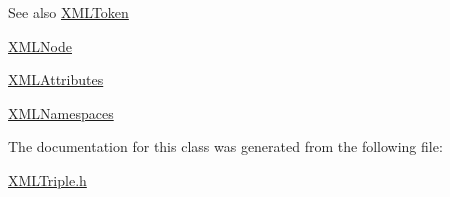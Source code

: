 \begin{DoxySeeAlso}{See also}
\hyperlink{class_x_m_l_token}{X\+M\+L\+Token} 

\hyperlink{class_x_m_l_node}{X\+M\+L\+Node} 

\hyperlink{class_x_m_l_attributes}{X\+M\+L\+Attributes} 

\hyperlink{class_x_m_l_namespaces}{X\+M\+L\+Namespaces} 
\end{DoxySeeAlso}


The documentation for this class was generated from the following file\+:\begin{DoxyCompactItemize}
\item 
\hyperlink{_x_m_l_triple_8h}{X\+M\+L\+Triple.\+h}\end{DoxyCompactItemize}
